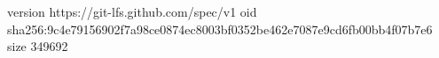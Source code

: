 version https://git-lfs.github.com/spec/v1
oid sha256:9c4e79156902f7a98ce0874ec8003bf0352be462e7087e9cd6fb00bb4f07b7e6
size 349692
